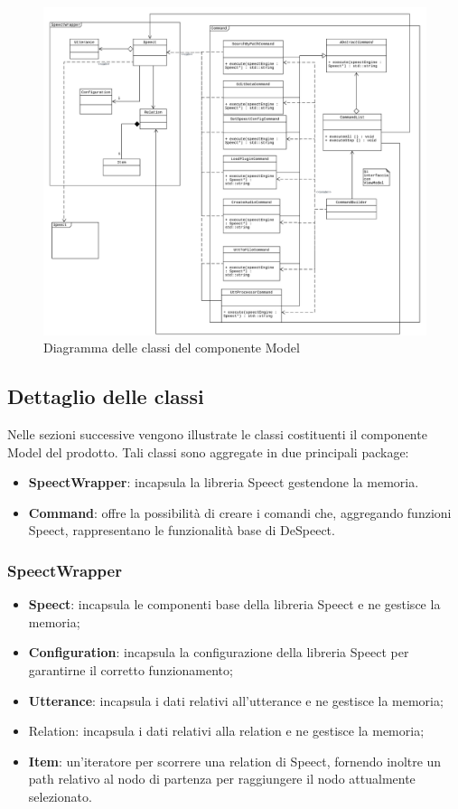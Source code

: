 \documentclass[openany,12pt,a4paper]{report}
\begin{document}
\begin{figure}[H]
	\hspace*{-20mm}
	\includegraphics[scale=0.5]{ModelDiagram}
	\centering
	\caption{Diagramma delle classi del componente Model}
\end{figure}

\subsection{Dettaglio delle classi}

Nelle sezioni successive vengono illustrate le classi costituenti il componente Model del prodotto. Tali classi sono aggregate in due principali package:
\begin{itemize}
	\item \textbf{SpeectWrapper}: incapsula la libreria Speect gestendone la memoria. 
	\item \textbf{Command}: offre la possibilità di creare i comandi che, aggregando funzioni Speect, rappresentano le funzionalità base di DeSpeect.
\end{itemize}

\subsubsection{SpeectWrapper}

\begin{itemize}
	\item \textbf{Speect}: incapsula le componenti base della libreria Speect e ne gestisce la memoria;
	\item \textbf{Configuration}: incapsula la configurazione della libreria Speect per garantirne il corretto funzionamento;
	\item \textbf{Utterance}: incapsula i dati relativi all'\Gls{utterance} e ne gestisce la memoria;
	\item \Gls{Relation}: incapsula i dati relativi alla relation e ne gestisce la memoria;
	\item \textbf{Item}: un'iteratore per scorrere una relation di Speect, fornendo inoltre un path relativo al nodo di partenza per raggiungere il nodo attualmente selezionato. 
\end{itemize}
\end{document}
